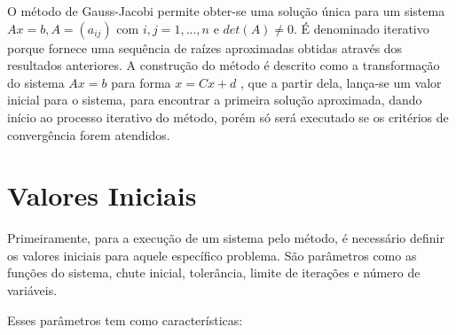 \documentclass[
12pt,				%
openright,			%
twoside,			%
a4paper,			%
english,			%
french,				%
spanish,			%
brazil				%
]{abntex2_new}
\begin{document}
		O método de Gauss-Jacobi permite obter-se uma solução única para um sistema
		$Ax=b, A = (a_{ij} ) $ com 
		$i,j=1,...,n$ e $det(A) \neq 0$. É denominado iterativo porque fornece uma
		sequência de raízes aproximadas
		obtidas através dos resultados anteriores. A construção do método é descrito
		como a transformação do 
		sistema $Ax = b$ para forma $x = Cx + d$ , que a partir dela, lança-se um valor
		inicial para o sistema, 
		para encontrar a primeira solução aproximada, dando início ao processo iterativo
		do método, porém 
		só será executado se os critérios de convergência forem atendidos.
		
		\section{Valores Iniciais}
		Primeiramente, para a execução de um sistema pelo método, é 
		necessário definir os valores iniciais para aquele 
		específico problema. São parâmetros como as funções do
		sistema,
		chute inicial, tolerância, limite de iterações e número
		de variáveis.
		
		Esses parâmetros tem como características:
		
\end{document}
